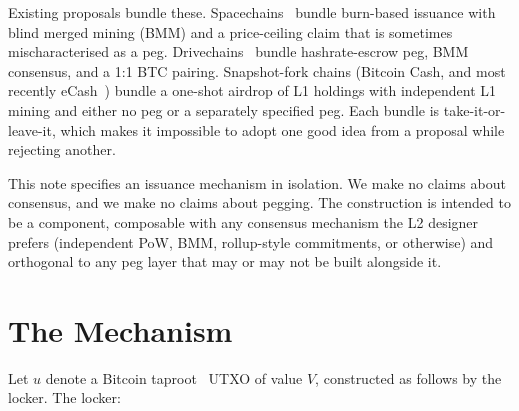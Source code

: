 \documentclass[11pt,a4paper]{article}
\begin{document}
\noindent Existing proposals bundle these. Spacechains~\cite{spacechain} bundle burn-based issuance with blind merged mining (BMM) and a price-ceiling claim that is sometimes mischaracterised as a peg. Drivechains~\cite{bip300,bip301} bundle hashrate-escrow peg, BMM consensus, and a 1:1 BTC pairing. Snapshot-fork chains (Bitcoin Cash, and most recently eCash~\cite{ecash}) bundle a one-shot airdrop of L1 holdings with independent L1 mining and either no peg or a separately specified peg. Each bundle is take-it-or-leave-it, which makes it impossible to adopt one good idea from a proposal while rejecting another.

This note specifies an issuance mechanism in isolation. We make no claims about consensus, and we make no claims about pegging. The construction is intended to be a component, composable with any consensus mechanism the L2 designer prefers (independent PoW, BMM, rollup-style commitments, or otherwise) and orthogonal to any peg layer that may or may not be built alongside it.

\section{The Mechanism}
\label{sec:mechanism}

Let $u$ denote a Bitcoin taproot~\cite{bip341} UTXO of value $V$, constructed as follows by the locker. The locker:
\end{document}
